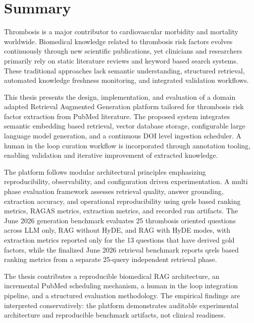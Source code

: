 \chapter*{Summary}

Thrombosis is a major contributor to cardiovascular morbidity and mortality worldwide. Biomedical knowledge related to thrombosis risk factors evolves continuously through new scientific publications, yet clinicians and researchers primarily rely on static literature reviews and keyword based search systems. These traditional approaches lack semantic understanding, structured retrieval, automated knowledge freshness monitoring, and integrated validation workflows.

This thesis presents the design, implementation, and evaluation of a domain adapted Retrieval Augmented Generation platform tailored for thrombosis risk factor extraction from PubMed literature. The proposed system integrates semantic embedding based retrieval, vector database storage, configurable large language model generation, and a continuous DOI level ingestion scheduler. A human in the loop curation workflow is incorporated through annotation tooling, enabling validation and iterative improvement of extracted knowledge.

The platform follows modular architectural principles emphasizing reproducibility, observability, and configuration driven experimentation. A multi phase evaluation framework assesses retrieval quality, answer grounding, extraction accuracy, and operational reproducibility using qrels based ranking metrics, RAGAS metrics, extraction metrics, and recorded run artifacts. The June 2026 generation benchmark evaluates 25 thrombosis oriented questions across LLM only, RAG without HyDE, and RAG with HyDE modes, with extraction metrics reported only for the 13 questions that have derived gold factors, while the finalized June 2026 retrieval benchmark reports qrels based ranking metrics from a separate 25-query independent retrieval phase.

The thesis contributes a reproducible biomedical RAG architecture, an incremental PubMed scheduling mechanism, a human in the loop integration pipeline, and a structured evaluation methodology. The empirical findings are interpreted conservatively: the platform demonstrates auditable experimental architecture and reproducible benchmark artifacts, not clinical readiness.


